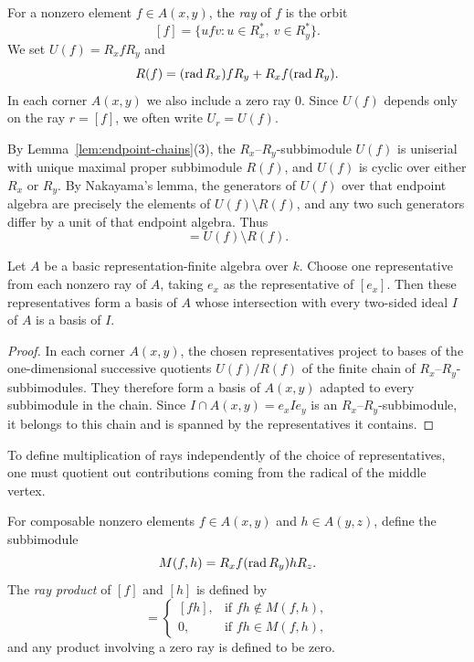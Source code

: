 \begin{definition}
\label{def:rays}
For a nonzero element $f\in A(x,y)$, the \emph{ray} of $f$ is the orbit
\[
 [f]=\{ufv:u\in R_x^*,\ v\in R_y^*\}.
\]
We set $U(f)=R_xfR_y$ and
\[
 R(f)=(\operatorname{rad} R_x)fR_y+R_xf(\operatorname{rad} R_y).
\]
In each corner $A(x,y)$ we also include a zero ray $0$. Since $U(f)$ depends
only on the ray $r=[f]$, we often write $U_r=U(f)$.
\end{definition}

By Lemma~\ref{lem:endpoint-chains}(3), the $R_x$--$R_y$-subbimodule $U(f)$ is
uniserial with unique maximal proper subbimodule $R(f)$, and $U(f)$ is cyclic
over either $R_x$ or $R_y$. By Nakayama's lemma, the generators of $U(f)$ over
that endpoint algebra are precisely the elements of $U(f)\setminus R(f)$, and
any two such generators differ by a unit of that endpoint algebra. Thus
\begin{equation}
                        [f]=U(f)\setminus R(f).
\label{eq:ray-layer}
\end{equation}

\begin{corollary}
\label{cor:ray-transversal}
Let $A$ be a basic representation-finite algebra over $k$. Choose one
representative from each nonzero ray of $A$, taking $e_x$ as the
representative of $[e_x]$. Then these representatives form a basis of $A$
whose intersection with every two-sided ideal $I$ of $A$ is a basis of $I$.
\end{corollary}
\begin{proof}
In each corner $A(x,y)$, the chosen representatives project to bases of the
one-dimensional successive quotients $U(f)/R(f)$ of the finite chain of
$R_x$--$R_y$-subbimodules. They therefore form a basis of $A(x,y)$ adapted
to every subbimodule in the chain. Since $I\cap A(x,y)=e_xIe_y$ is an
$R_x$--$R_y$-subbimodule, it belongs to this chain and is spanned by the
representatives it contains.
\end{proof}

To define multiplication of rays independently of the choice of
representatives, one must quotient out contributions coming from the radical
of the middle vertex.

\begin{definition}
\label{def:ray-product}
For composable nonzero elements $f\in A(x,y)$ and $h\in A(y,z)$, define the
subbimodule
\[
                  M(f,h)=R_x f(\operatorname{rad} R_y)hR_z.
\]
The \emph{ray product} of $[f]$ and $[h]$ is defined by
\begin{equation}
 [f][h]=
 \begin{cases}
 [fh],&\text{if }fh\notin M(f,h),\\
 0,&\text{if }fh\in M(f,h),
 \end{cases}
 \label{eq:ray-product}
\end{equation}
and any product involving a zero ray is defined to be zero.
\end{definition}

